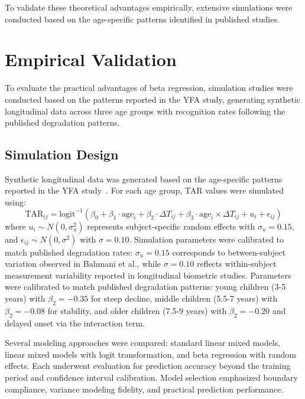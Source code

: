 \documentclass[10pt,journal,compsoc]{IEEEtran}
\begin{document}
To validate these theoretical advantages empirically, extensive simulations were conducted based on the age-specific patterns identified in published studies.

\section{Empirical Validation}
\label{sec:validation}

To evaluate the practical advantages of beta regression, simulation studies were conducted based on the patterns reported in the YFA study, generating synthetic longitudinal data across three age groups with recognition rates following the published degradation patterns.

\subsection{Simulation Design}

Synthetic longitudinal data was generated based on the age-specific patterns reported in the YFA study~\cite{bahmani2023}. For each age group, TAR values were simulated using:
\begin{equation}
\text{TAR}_{ij} = \text{logit}^{-1}(\beta_0 + \beta_1 \cdot \text{age}_i + \beta_2 \cdot \Delta T_{ij} + \beta_3 \cdot \text{age}_i \times \Delta T_{ij} + u_i + \epsilon_{ij})
\end{equation}
where $u_i \sim N(0, \sigma^2_u)$ represents subject-specific random effects with $\sigma_u = 0.15$, and $\epsilon_{ij} \sim N(0, \sigma^2)$ with $\sigma = 0.10$. Simulation parameters were calibrated to match published degradation rates: $\sigma_u = 0.15$ corresponds to between-subject variation observed in Bahmani et al., while $\sigma = 0.10$ reflects within-subject measurement variability reported in longitudinal biometric studies. Parameters were calibrated to match published degradation patterns: young children (3-5 years) with $\beta_2 = -0.35$ for steep decline, middle children (5.5-7 years) with $\beta_2 = -0.08$ for stability, and older children (7.5-9 years) with $\beta_2 = -0.20$ and delayed onset via the interaction term.

Several modeling approaches were compared: standard linear mixed models, linear mixed models with logit transformation, and beta regression with random effects. Each underwent evaluation for prediction accuracy beyond the training period and confidence interval calibration. Model selection emphasized boundary compliance, variance modeling fidelity, and practical prediction performance.
\end{document}
